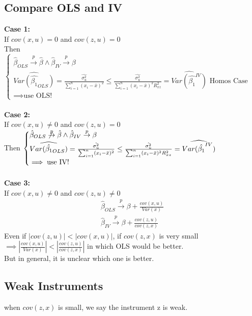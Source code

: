 \documentclass{article}
\theoremstyle{definition}
\theoremstyle{thrm}
\theoremstyle{lma}
\theoremstyle{ppst}
\theoremstyle{crlr}
\begin{document}
\subsection{Compare OLS and IV}
\textbf{Case 1:}\\
If $cov(x,u) = 0$ and $cov(z,u) = 0$\\
Then $\begin{cases}
	\hat{\beta}_{OLS}\stackrel{p}{\to} \hat{\beta} \wedge \hat{\beta}_{IV} \stackrel{p}{\to} \beta\\
	\widehat{Var(\hat{\beta_1}_{OLS})} = \frac{\hat{\sigma_u^2}}{\sum_{i=1}^n(x_i-\bar{x})^2} \leq \frac{\hat{\sigma_u^2}}{\sum_{i=1}^n(x_i-\bar{x})^2R_{xz}^2} = \widehat{Var(\hat{\beta_1}^{IV})}\text{ Homos Case}\\
	\implies \text{use OLS!}
\end{cases}$\\
\\
\textbf{Case 2:}\\
If $cov(x,u) \neq 0$ and $cov(z,u) = 0$\\
Then $\begin{cases}
	\hat{\beta}_{OLS}\not\stackrel{p}{\to} \hat{\beta} \wedge \hat{\beta}_{IV} \stackrel{p}{\to} \beta\\
	\widehat{Var(\hat{\beta_1}_{OLS})} = \frac{\hat{\sigma_u^2}}{\sum_{i=1}^n(x_i-\bar{x})^2} \leq \frac{\hat{\sigma_u^2}}{\sum_{i=1}^n(x_i-\bar{x})^2R_{xz}^2} = \widehat{Var(\hat{\beta_1}^{IV})}\\
	\implies \text{use IV!}
\end{cases}$\\
\\
\textbf{Case 3:}\\
If $cov(x,u) \neq 0$ and $cov(z,u) \neq 0$\\
\begin{align*}
	\hat{\beta}_{OLS}\stackrel{p}{\to} \beta +\frac{cov(x,u)}{Var(x)}\\
	\hat{\beta}_{IV}\stackrel{p}{\to} \beta + \frac{cov(z,u)}{cov(z,x)}
\end{align*}
Even if $|cov(z,u)|<|cov(x,u)|$, if $cov(z,x)$ is very small $\implies |\frac{cov(x,u)}{Var(x)}|<|\frac{cov(z,u)}{cov(z,x)}|$ in which OLS would be better. \\
But in general, it is unclear which one is better.

\subsection{Weak Instruments}
when $cov(z,x)$ is small, we say the instrument z is weak.
\end{document}
